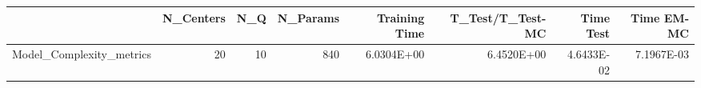 \begin{tabular}{lrrrrrrr}
\toprule
{} &  N\_Centers &  N\_Q &  N\_Params &  Training Time &  T\_Test/T\_Test-MC &  Time Test &  Time EM-MC \\
\midrule
Model\_Complexity\_metrics &         20 &   10 &       840 &     6.0304E+00 &        6.4520E+00 & 4.6433E-02 &  7.1967E-03 \\
\bottomrule
\end{tabular}
